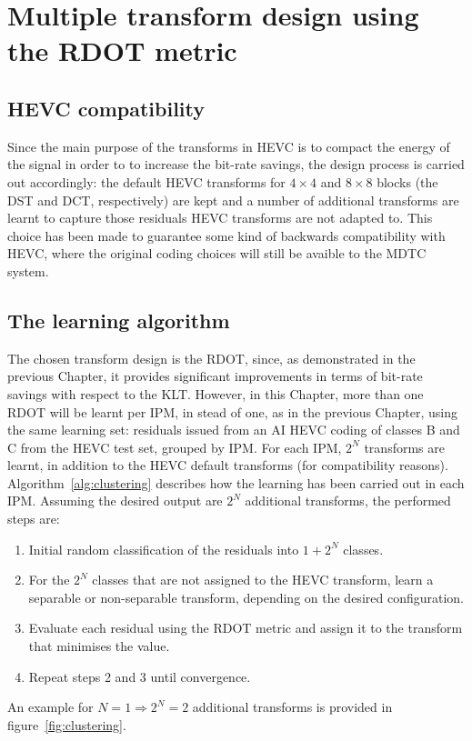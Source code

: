 \documentclass[11pt,a4paper,openright,twoside]{book}
\numberwithin{equation}{section} %
\numberwithin{figure}{section} %
\numberwithin{table}{section} %
\begin{document}
\section{Multiple transform design using the \acs{RDOT} metric}
\label{sec:multiple_transform_design}

\subsection{\acs{HEVC} compatibility}
\label{sub:mdtc_hevc_compatibility}

Since the main purpose of the transforms in \ac{HEVC} is to compact the energy
of the signal in order to to increase the bit-rate savings, the design process
is carried out accordingly:
the default \ac{HEVC} transforms for $4\times4$ and $8\times8$ blocks (the
\ac{DST} and \ac{DCT}, respectively) are kept and a number of additional
transforms are learnt to capture those residuals \ac{HEVC} transforms are not
adapted to.
This choice has been made to guarantee some kind of backwards compatibility
with \ac{HEVC}, where the original coding choices will still be avaible to the
\ac{MDTC} system.

\subsection{The learning algorithm}
\label{sub:mdtc_learning_algorithm}

The chosen transform design is the \ac{RDOT}, since, as demonstrated in the
previous Chapter, it provides significant improvements in terms of bit-rate
savings with respect to the \ac{KLT}.
However, in this Chapter, more than one \ac{RDOT} will be learnt per \ac{IPM},
in stead of one, as in the previous Chapter, using the same learning set:
residuals issued from an \ac{AI} \ac{HEVC} coding of classes B and C from the
\ac{HEVC} test set, grouped by \ac{IPM}.
For each \ac{IPM}, $2^N$ transforms are learnt, in addition to the \ac{HEVC}
default transforms (for compatibility reasons).
Algorithm~\ref{alg:clustering} describes how the learning has been carried out
in each \ac{IPM}.
Assuming the desired output are $2^N$ additional transforms, the performed
steps are:
\begin{enumerate}
	\item Initial random classification of the residuals into $1+2^N$ classes.
	\item For the $2^N$ classes that are not assigned to the \ac{HEVC}
		transform, learn a separable or non-separable transform, depending on
		the desired configuration.
	\item Evaluate each residual using the RDOT metric and assign it to the
		transform that minimises the value.
	\item Repeat steps 2 and 3 until convergence.
\end{enumerate}
An example for $N=1\Rightarrow2^N=2$ additional transforms is provided in
figure~\ref{fig:clustering}.
\end{document}
